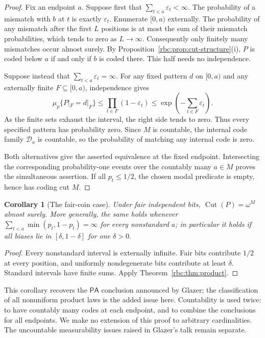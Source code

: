 \documentclass[11pt]{article}
\numberwithin{equation}{section}
\newtheorem{corollary}[theorem]{Corollary}
\theoremstyle{definition}
\theoremstyle{remark}
\newcommand{\PA}{\mathsf{PA}}
\newcommand{\std}{\omega^M}
\newcommand{\Cut}{\operatorname{Cut}}
\newcommand{\coded}{\mathcal D}
\begin{document}
\begin{proof}
Fix an endpoint $a$. Suppose first that
$\sum_{t<a}\varepsilon_t<\infty$. The probability of a mismatch with $b$
at $t$ is exactly $\varepsilon_t$. Enumerate $[0,a)$ externally. The
probability of any mismatch after the first $L$ positions is at most the
sum of their mismatch probabilities, which tends to zero as $L\to\infty$.
Consequently only finitely many mismatches occur almost surely. By
Proposition~\ref{rbc:prop:cut-structure}(i), $P$ is coded below $a$ if and only
if $b$ is coded there. This half needs no independence.

Suppose instead that $\sum_{t<a}\varepsilon_t=\infty$. For any fixed
pattern $d$ on $[0,a)$ and any externally finite $F\subseteq[0,a)$,
independence gives
\begin{equation}
 \mu_p\{P|_F=d|_F\}
 \le\prod_{t\in F}(1-\varepsilon_t)
 \le\exp\left(-\sum_{t\in F}\varepsilon_t\right).
\label{rbc:eq:singleton-bound}
\end{equation}
As the finite sets exhaust the interval, the right side tends to zero.
Thus every specified pattern has probability zero. Since $M$ is countable,
the internal code family $\coded_a$ is countable, so the probability of
matching any internal code is zero.

Both alternatives give the asserted equivalence at the fixed endpoint.
Intersecting the corresponding probability-one events over the countably
many $a\in M$ proves the simultaneous assertion. If all $p_t\le1/2$, the
chosen modal predicate is empty, hence has coding cut $M$.
\end{proof}

\begin{corollary}[The fair-coin case]
\label{rbc:cor:fair}
Under fair independent bits, $\Cut(P)=\std$ almost surely. More generally,
the same holds whenever
$\sum_{t<a}\min(p_t,1-p_t)=\infty$ for every nonstandard $a$; in
particular it holds if all biases lie in $[\delta,1-\delta]$ for one
$\delta>0$.
\end{corollary}

\begin{proof}
Every nonstandard interval is externally infinite. Fair bits contribute
$1/2$ at every position, and uniformly nondegenerate bits contribute at
least $\delta$. Standard intervals have finite sums. Apply
Theorem~\ref{rbc:thm:product}.
\end{proof}

This corollary recovers the $\PA$ conclusion announced by Glazer; the
classification of all nonuniform product laws is the added issue here.
Countability is used twice: to have countably many codes at each endpoint,
and to combine the conclusions for all endpoints. We make no extension of
this proof to arbitrary cardinalities. The uncountable measurability issues
raised in Glazer's talk remain separate.
\end{document}
